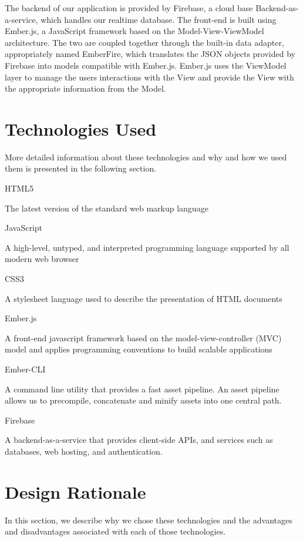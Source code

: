 \par The backend of our application is provided by Firebase, a cloud base Backend-as-a-service, which handles our realtime database. The front-end is built using Ember.js, a JavaScript framework based on the Model-View-ViewModel architecture. The two are coupled together through the built-in data adapter, appropriately named EmberFire, which translates the JSON objects provided by Firebase into models compatible with Ember.js. Ember.js uses the ViewModel layer to manage the users interactions with the View and provide the View with the appropriate information from the Model.

\section{Technologies Used}
 More detailed information about these technologies and why and how we used them is presented in the following section.

\begin{itemized}
\item HTML5 \par The latest version of the standard web markup language
\item JavaScript \par A high-level, untyped, and interpreted programming  language supported by all modern web browser
\item CSS3 \par A stylesheet language used to describe the presentation of HTML documents
\item Ember.js \par A front-end javascript framework based on the model-view-controller (MVC) model and applies programming conventions to build scalable applications
\item Ember-CLI \par A command line utility that provides a fast asset pipeline. An asset pipeline allows us to precompile, concatenate and minify assets into one central path.\cite{embercli}
\item  Firebase \par A backend-as-a-service that provides client-side APIs, and services such as databases, web hosting, and authentication.
\end{itemized}

\section{Design Rationale}
In this section, we describe why we chose these technologies and the advantages and disadvantages associated with each of those technologies. 
